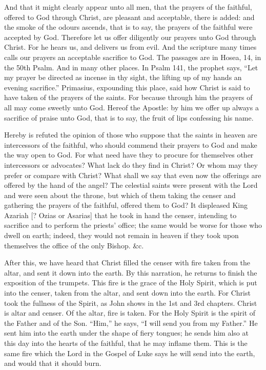 And that it might clearly appear unto all men, that the prayers of the faithful, offered to God through Christ, are pleasant and acceptable, there is added: and the smoke of the odours ascends, that is to say, the prayers of the faithful were accepted by God. Therefore let us offer diligently our prayers unto God through Christ. For he hears us, and delivers us from evil. And the scripture many times calls our prayers an acceptable sacrifice to God. The passages are in Hosea, 14, in the 50th Psalm. And in many other places. In Psalm 141, the prophet says, “Let my prayer be directed as incense in thy sight, the lifting up of my hands an evening sacrifice.” Primasius, expounding this place, said how Christ is said to have taken of the prayers of the saints. For because through him the prayers of all may come sweetly unto God. Hereof the Apostle: by him we offer up always a sacrifice of praise unto God, that is to say, the fruit of lips confessing his name.

Hereby is refuted the opinion of those who suppose that the saints in heaven are intercessors of the faithful, who should commend their prayers to God and make the way open to God. For what need have they to procure for themselves other intercessors or advocates? What lack do they find in Christ? Or whom may they prefer or compare with Christ? What shall we say that even now the offerings are offered by the hand of the angel? The celestial saints were present with the Lord and were seen about the throne, but which of them taking the censer and gathering the prayers of the faithful, offered them to God? It displeased King Azariah [? Ozias or Asarias] that he took in hand the censer, intending to sacrifice and to perform the priests’ office; the same would be worse for those who dwell on earth; indeed, they would not remain in heaven if they took upon themselves the office of the only Bishop. \&c.

After this, we have heard that Christ filled the censer with fire taken from the altar, and sent it down into the earth. By this narration, he returns to finish the exposition of the trumpets. This fire is the grace of the Holy Spirit, which is put into the censer, taken from the altar, and sent down into the earth. For Christ took the fullness of the Spirit, as John shows in the 1st and 3rd chapters. Christ is altar and censer. Of the altar, fire is taken. For the Holy Spirit is the spirit of the Father and of the Son. “Him,” he says, “I will send you from my Father.” He sent him into the earth under the shape of fiery tongues; he sends him also at this day into the hearts of the faithful, that he may inflame them. This is the same fire which the Lord in the Gospel of Luke says he will send into the earth, and would that it should burn.

